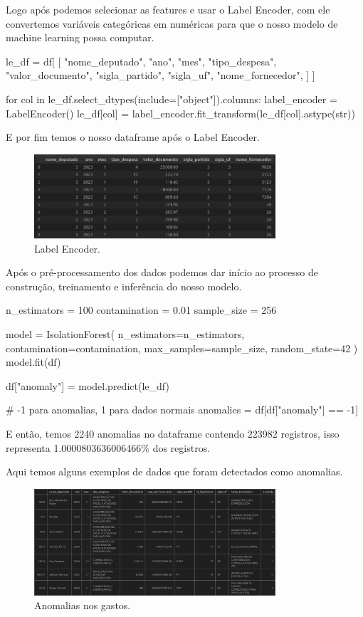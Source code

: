 \documentclass[12pt, a4paper]{article}
\begin{document}
Logo após podemos selecionar as features e usar o Label Encoder, com ele convertemos variáveis categóricas em numéricas para que o nosso modelo de machine learning possa computar.

\begin{python}
le_df = df[
	[
		"nome_deputado",
		"ano",
		"mes",
		"tipo_despesa",
		"valor_documento",
		"sigla_partido",
		"sigla_uf",
		"nome_fornecedor",
	]
]

for col in le_df.select_dtypes(include=["object"]).columns:
	label_encoder = LabelEncoder()
	le_df[col] = label_encoder.fit_transform(le_df[col].astype(str))
\end{python}

E por fim temos o nosso dataframe após o Label Encoder.

\begin{figure}[!htbp]
	\centering
	\includegraphics[width=0.8\textwidth]{assets/3_plot2.png}
	\caption{Label Encoder.}
	\label{fig:label encoder}
\end{figure}
\newpage

Após o pré-processamento dos dados podemos dar início ao processo de construção, treinamento e inferência do nosso modelo.

\begin{python}
n_estimators = 100
contamination = 0.01
sample_size = 256	

model = IsolationForest(
	n_estimators=n_estimators,
	contamination=contamination,
	max_samples=sample_size,
	random_state=42
)
model.fit(df)

df["anomaly"] = model.predict(le_df)

# -1 para anomalias, 1 para dados normais
anomalies = df[df["anomaly"] == -1]
\end{python}

E então, temos 2240 anomalias no dataframe contendo 223982 registros, isso representa 1.0000803636006466\% dos registros.

Aqui temos alguns exemplos de dados que foram detectados como anomalias.

\begin{figure}[!htbp]
	\centering
	\includegraphics[width=0.8\textwidth]{assets/3_plot3.png}
	\caption{Anomalias nos gastos.}
	\label{fig:anomalias}
\end{figure}
\end{document}
